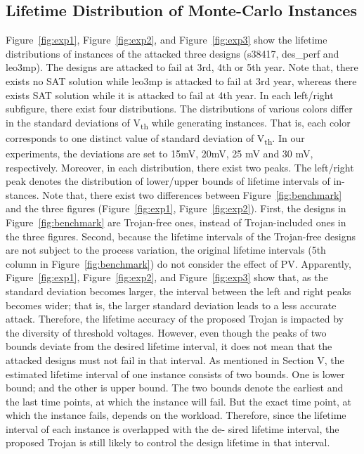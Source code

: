 \subsection{Lifetime Distribution of Monte-Carlo Instances}
\label{sec:exp:exp}
Figure~\ref{fig:exp1}, Figure~\ref{fig:exp2}, and Figure~\ref{fig:exp3} show the lifetime distributions of instances of the attacked three designs (s38417, des\_perf and leo3mp). The designs are attacked to fail at 3rd, 4th or 5th year. Note that, there exists no SAT solution while leo3mp is attacked to fail at 3rd year, whereas there exists SAT solution while it is attacked to fail at 4th year. In each left/right subfigure, there exist four distributions. The distributions of various colors differ in the standard deviations of V\textsubscript{th} while generating instances. That is, each color corresponds to one distinct value of standard deviation of V\textsubscript{th}. In our experiments, the deviations are set to 15mV, 20mV, 25 mV and 30 mV, respectively. Moreover, in each distribution, there exist two peaks. The left/right peak denotes the distribution of lower/upper bounds of lifetime intervals of in- stances. Note that, there exist two differences between Figure~\ref{fig:benchmark} and the three figures (Figure~\ref{fig:exp1}, Figure~\ref{fig:exp2}). First, the designs in Figure~\ref{fig:benchmark} are Trojan-free ones, instead of Trojan-included ones in the three figures. Second, because the lifetime intervals of the Trojan-free designs are not subject to the process variation, the original lifetime intervals (5th column in Figure~\ref{fig:benchmark}) do not consider the effect of PV.
Apparently, Figure~\ref{fig:exp1}, Figure~\ref{fig:exp2}, and Figure~\ref{fig:exp3} show that, as the standard deviation becomes larger, the interval between the left and right peaks becomes wider; that is, the larger standard deviation leads to a less accurate attack. Therefore, the lifetime accuracy of the proposed Trojan is impacted by the diversity of threshold voltages. However, even though the peaks of two bounds deviate from the desired lifetime interval, it does not mean that the attacked designs must not fail in that interval. As mentioned in Section V, the estimated lifetime interval of one instance consists of two bounds. One is lower bound; and the other is upper bound. The two bounds denote the earliest and the last time points, at which the instance will fail. But the exact time point, at which the instance fails, depends on the workload. Therefore, since the lifetime interval of each instance is overlapped with the de- sired lifetime interval, the proposed Trojan is still likely to control the design lifetime in that interval.

